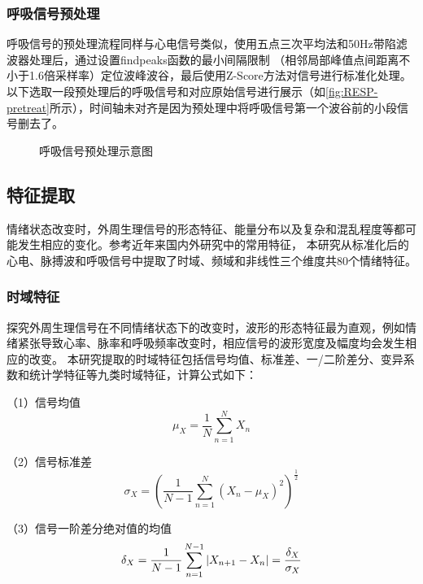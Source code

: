 \subsubsection{呼吸信号预处理}
呼吸信号的预处理流程同样与心电信号类似，使用五点三次平均法和50Hz带陷滤波器处理后，通过设置findpeaks函数的最小间隔限制
（相邻局部峰值点间距离不小于1.6倍采样率）定位波峰波谷，最后使用Z-Score方法对信号进行标准化处理。
以下选取一段预处理后的呼吸信号和对应原始信号进行展示（如\autoref{fig:RESP-pretreat}所示），时间轴未对齐是因为预处理中将呼吸信号第一个波谷前的小段信号删去了。

\begin{figure}[htbp]
    \caption[呼吸信号预处理示意图]{呼吸信号预处理示意图}
    \label{fig:RESP-pretreat}
\end{figure}

\subsection{特征提取}
情绪状态改变时，外周生理信号的形态特征、能量分布以及复杂和混乱程度等都可能发生相应的变化。参考近年来国内外研究中的常用特征，
本研究从标准化后的心电、脉搏波和呼吸信号中提取了时域、频域和非线性三个维度共80个情绪特征。

\subsubsection{时域特征}
探究外周生理信号在不同情绪状态下的改变时，波形的形态特征最为直观，例如情绪紧张导致心率、脉率和呼吸频率改变时，相应信号的波形宽度及幅度均会发生相应的改变。
本研究提取的时域特征包括信号均值、标准差、一/二阶差分、变异系数和统计学特征等九类时域特征，计算公式如下：

（1）信号均值
\begin{equation}
    \label{equ:Mean}
    \mu_{X}=\frac{1}{N} \sum_{n=1}^{N} X_{n}
\end{equation}

（2）信号标准差
\begin{equation}
    \label{equ:STD}
    \sigma_{X}=\left(\frac{1}{N-1} \sum_{n=1}^{N}\left(X_{n}-\mu_{X}\right)^{2}\right)^{\frac{1}{2}}
\end{equation}

（3）信号一阶差分绝对值的均值
\vspace{-1ex}
\begin{equation}
    \label{equ:Delta}
    \delta_{X}=\frac{1}{N-1} \sum_{n=1}^{N-1}\left|X_{n+1}-X_{n}\right|=\frac{\delta_{X}}{\sigma_{X}}
    \vspace{-1ex}
\end{equation}


